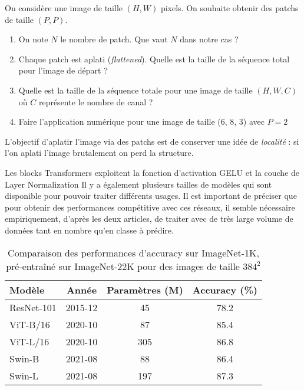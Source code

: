 \documentclass{beamer}
\begin{document}
\begin{frame}{}{}
	\begin{exercice}
		On considère une image de taille $(H, W)$ pixels. On souhaite obtenir des patchs de taille $(P, P)$.
		\begin{enumerate}
			\item On note $N$ le nombre de patch. Que vaut $N$ dans notre cas ?
			\item Chaque patch est aplati (\textit{flattened}). Quelle est la taille de la séquence total pour l'image de départ ?
			\item Quelle est la taille de la séquence totale pour une image de taille $(H, W, C)$ où $C$ représente le nombre de canal ?
			\item Faire l'application numérique pour une image de taille (6, 8, 3) avec $P=2$
		\end{enumerate}
	\end{exercice}
	
	L'objectif d'aplatir l'image via des patchs est de conserver une idée de \textit{localité} : si l'on aplati l'image brutalement on perd la structure.
\end{frame}

\begin{frame}{}{}
	Les blocks Transformers exploitent la fonction d'activation GELU et la couche de Layer Normalization Il y a également plusieurs tailles de modèles qui sont disponible pour pouvoir traiter différents usages. Il est important de préciser que pour obtenir des performances compétitive avec ces réseaux, il semble nécessaire empiriquement, d'après les deux articles, de traiter avec de très large volume de données tant en nombre qu'en classe à prédire. \newline

	\begin{table}[h!]
		\begin{center}
			\begin{tabular}{@{}lccc}\toprule
				Modèle & Année & Paramètres (M)& Accuracy (\%) \\\midrule
				ResNet-101 & 2015-12 & 45 & 78.2\\[0.25cm]
				ViT-B/16 & 2020-10 & 87 & 85.4\\
				ViT-L/16 & 2020-10 & 305 & 86.8\\[0.25cm]
				Swin-B & 2021-08 & 88 & 86.4\\
				Swin-L & 2021-08 & 197 & 87.3\\\bottomrule
			\end{tabular}
		\end{center}
		\caption{Comparaison des performances d'accuracy sur ImageNet-1K, pré-entraîné sur ImageNet-22K pour des images de taille $384^2$}
	\end{table}
\end{frame}
\end{document}
